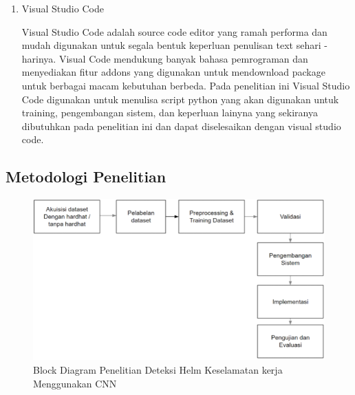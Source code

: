 \begin{enumerate}
\begin{enumerate}
    \item Visual Studio Code
    \par Visual Studio Code adalah source code editor yang ramah performa dan mudah digunakan untuk segala bentuk keperluan penulisan text sehari - harinya. Visual Code mendukung banyak bahasa pemrograman dan menyediakan fitur addons yang digunakan untuk mendownload package untuk berbagai macam kebutuhan berbeda. Pada penelitian ini Visual Studio Code digunakan untuk menulisa script python yang akan digunakan untuk training, pengembangan sistem, dan keperluan lainyna yang sekiranya dibutuhkan pada penelitian ini dan dapat diselesaikan dengan visual studio code.\cite{microsoft_2021}

  \end{enumerate}


\end{enumerate}



\subsection{Metodologi Penelitian}
\label{metodologipenelitian}

\begin{figure}[ht]
  \centering
  \includegraphics[scale=0.4]{gambar/blockdiagram-helmetdetection.png}
  \caption{Block Diagram Penelitian Deteksi Helm Keselamatan kerja Menggunakan CNN}
  \label{fig:blockdiagramhelmetdetection}  
\end{figure}

